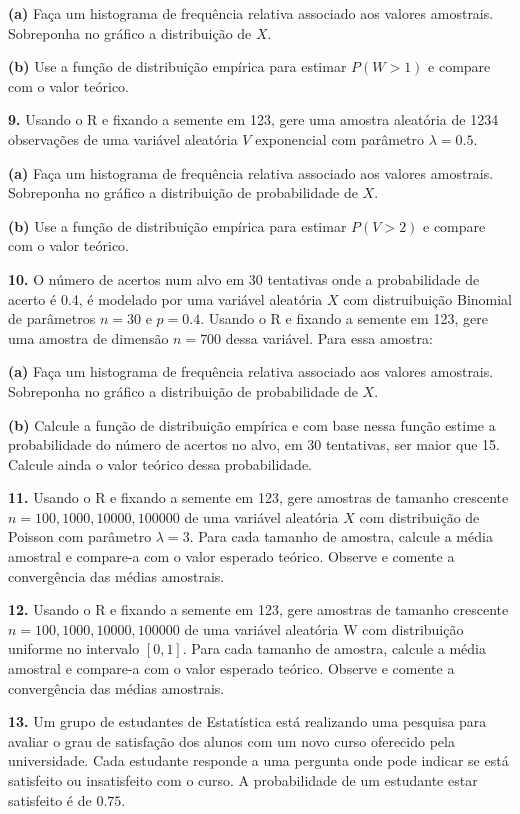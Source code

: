 \documentclass[
]{book}
\begin{document}
\textbf{(a)} Faça um histograma de frequência relativa associado aos valores
amostrais. Sobreponha no gráfico a distribuição de \(X\).

\textbf{(b)} Use a função de distribuição empírica para estimar \(P(W > 1)\) e
compare com o valor teórico.

\textbf{9.} Usando o R e fixando a semente em 123, gere uma amostra aleatória
de 1234 observações de uma variável aleatória \(V\) exponencial com
parâmetro \(\lambda = 0.5\).

\textbf{(a)} Faça um histograma de frequência relativa associado aos valores
amostrais. Sobreponha no gráfico a distribuição de probabilidade de \(X\).

\textbf{(b)} Use a função de distribuição empírica para estimar \(P(V > 2)\) e
compare com o valor teórico.

\textbf{10.} O número de acertos num alvo em 30 tentativas onde a
probabilidade de acerto é 0.4, é modelado por uma variável aleatória \(X\)
com distruibuição Binomial de parâmetros \(n=30\) e \(p=0.4\). Usando o R e
fixando a semente em 123, gere uma amostra de dimensão \(n=700\) dessa
variável. Para essa amostra:

\textbf{(a)} Faça um histograma de frequência relativa associado aos valores
amostrais. Sobreponha no gráfico a distribuição de probabilidade de \(X\).

\textbf{(b)} Calcule a função de distribuição empírica e com base nessa
função estime a probabilidade do número de acertos no alvo, em 30
tentativas, ser maior que 15. Calcule ainda o valor teórico dessa
probabilidade.

\textbf{11.} Usando o R e fixando a semente em 123, gere amostras de tamanho
crescente \(n = 100, 1000, 10000, 100000\) de uma variável aleatória \(X\)
com distribuição de Poisson com parâmetro \(\lambda = 3\). Para cada
tamanho de amostra, calcule a média amostral e compare-a com o valor
esperado teórico. Observe e comente a convergência das médias amostrais.

\textbf{12.} Usando o R e fixando a semente em 123, gere amostras de tamanho
crescente \(n = 100, 1000, 10000, 100000\) de uma variável aleatória W com
distribuição uniforme no intervalo \([0, 1]\). Para cada tamanho de
amostra, calcule a média amostral e compare-a com o valor esperado
teórico. Observe e comente a convergência das médias amostrais.

\textbf{13.} Um grupo de estudantes de Estatística está realizando uma
pesquisa para avaliar o grau de satisfação dos alunos com um novo curso
oferecido pela universidade. Cada estudante responde a uma pergunta onde
pode indicar se está satisfeito ou insatisfeito com o curso. A
probabilidade de um estudante estar satisfeito é de \(0.75\).
\end{document}
